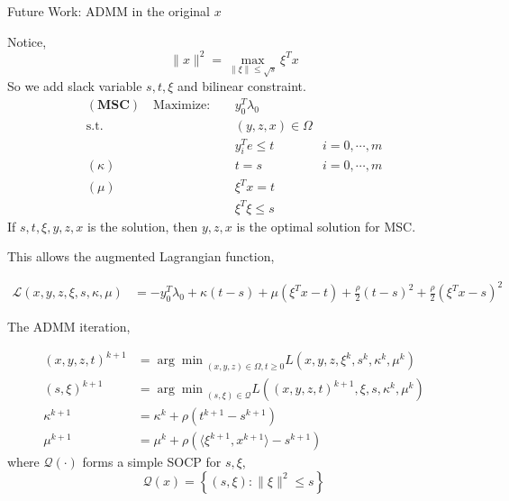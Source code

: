 \documentclass[aspectratio=1610, 10pt]{beamer}
\newcommand{\model}[1]{(\textbf{#1})}
\begin{document}
\begin{frame}[allowframebreaks]{Future Work: ADMM in the original \(x\)}

  Notice,
  \begin{equation}
    \|x\|^2 = \max_{\|\xi\| \le \sqrt s} \xi^T x
  \end{equation}
  So we add slack variable \(s, t, \xi\) and bilinear constraint.
  \begin{align}
    \model{MSC} \quad \mathrm{Maximize: }\quad & y_0 ^T\lambda_0                     \\
    \mathrm{s.t.} \quad                        & (y,z,x) \in \Omega                  \\
                                               & y_i^Te \le t       & i=0, \cdots, m \\
    (\kappa) \quad                             & t= s               & i=0, \cdots, m \\
    (\mu)    \quad                             & \xi^Tx = t                          \\
                                               & \xi^T\xi \le s
  \end{align}
  If \(s, t, \xi, y, z, x\) is the solution, then \( y, z, x\) is the optimal solution for MSC.

  This allows the augmented Lagrangian function,

  \begin{align*}
    \mathscr L\left(x,y,z,\xi,s,\kappa,\mu\right) & = - y_0 ^T\lambda_0 + \kappa(t-s) + \mu(\xi^Tx - t) + \frac{\rho}{2}(t-s)^2 + \frac{\rho}{2}(\xi^Tx - s)^2
  \end{align*}

  The ADMM iteration,

  \begin{align*}
    (x,y,z,t)^{k+1} & = {\arg\min}_{(x,y,z)\in\Omega, t\ge 0} L\left(x,y,z,\xi^k,s^k,\kappa^k,\mu^k\right)       \\
    (s, \xi)^{k+1}  & = {\arg\min}_{(s, \xi)\in\mathscr{Q}} L\left((x,y,z,t)^{k+1},\xi,s, \kappa^k, \mu^k\right) \\
    \kappa^{k+1}    & = \kappa^k + \rho\left(t^{k+1}-s^{k+1}\right)                                              \\
    \mu^{k+1}       & = \mu^k + \rho\left( \langle\xi^{k+1}, x^{k+1}\rangle - s^{k+1}\right)
  \end{align*}
  where \(\mathscr{Q(\cdot)}\) forms a simple SOCP for \(s, \xi\),
  \begin{equation}
    \mathscr{Q}(x) =\left\{(s,\xi): \|\xi\|^2 \le s\right\}
  \end{equation}


\end{frame}
\end{document}
